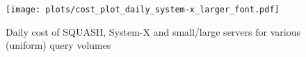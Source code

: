 \begin{figure}[h]%
\centering  %
\texttt{[image: plots/cost\_plot\_daily\_system-x\_larger\_font.pdf]}
\caption{Daily cost of SQUASH, System-X and small/large servers for various (uniform) query volumes}
\label{fig:squash-daily-cost-plot}
\end{figure}
